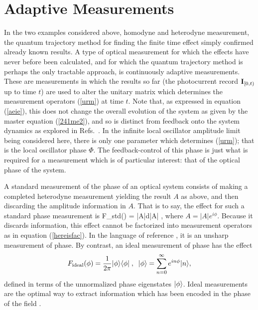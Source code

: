 \documentclass[12pt]{article}
\begin{document}
\section{Adaptive Measurements} 

In the two examples considered above, homodyne and heterodyne measurement, the
quantum trajectory method for finding the finite time effect simply confirmed
already known results. A type of optical measurement for which the effects have
never before been calculated, and for which the quantum trajectory method is perhaps
the only tractable approach, is continuously adaptive measurements. These are
measurements in which the results so far (the photocurrent record ${\bf I}_{[0,t)}$ up to time
$t$) are used to alter the unitary matrix which determines the measurement operators
(\ref{urm}) at time $t$. Note that, as expressed in equation (\ref{aeie}), this does
not change the overall evolution of the system as given by the master equation
(\ref{241me2}), and so is distinct from feedback onto the system dynamics as explored
in Refs.~\cite{WisMil93b,WisMil94a,Wis94a}. In the infinite local oscillator amplitude
limit being considered here, there is only one parameter which determines
(\ref{urm}); that is the local oscillator phase $\Phi$. The feedback-control of this
phase is just what is required for a measurement which is of particular interest:
that of the optical phase of the system.

A standard measurement of the phase of an optical system consists of making a
completed heterodyne measurement yielding the result $A$ as above, and then
discarding the amplitude information in $A$. That is to say, the effect for such a
standard phase measurement is
\beq
F_{\rm std}(\phi) = \int |A|d|A|  ,
\eeq
where $A=|A|e^{i\phi}$. Because it discards information, this effect cannot be
factorized into measurement operators as in equation (\ref{hereisfac}). In the
language of reference \cite{Uff93}, it is an unsharp measurement of phase. By contrast,
an ideal measurement of phase \cite{Lon27,PSphase93,LeoVacBohPau95} has the
effect 
\begin{equation} \label{Fopt1}
 {F}_{\rm ideal}(\phi)=\frac{1}{2\pi} |{\phi}\rangle\langle{\phi}| \; , \;\;
|{\phi}\rangle = \sum_{n=0}^\infty e^{i n \phi} |{n}\rangle,
\end{equation}
defined in terms of the unnormalized phase eigenstates $| {\phi} \rangle$. Ideal measurements
are the optimal way to extract information which has been encoded in the phase of the
field \cite{HalFus91}.
\end{document}
